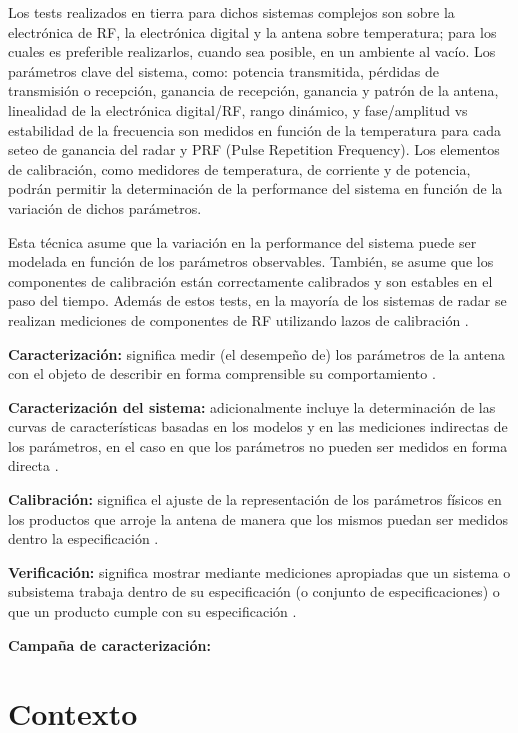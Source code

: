 Los tests realizados en tierra para dichos sistemas complejos son sobre la electrónica de RF, la electrónica digital y la 
antena sobre temperatura; para los cuales es preferible realizarlos, cuando sea posible, en un ambiente al vacío. Los 
parámetros clave del sistema, como: potencia transmitida, pérdidas de transmisión o recepción, ganancia de recepción, 
ganancia y patrón de la antena, linealidad de la electrónica digital/RF, rango dinámico, y fase/amplitud vs estabilidad de la 
frecuencia son medidos en función de la temperatura para cada seteo de ganancia del radar y PRF (Pulse Repetition Frequency). 
Los elementos de calibración, como medidores de temperatura, de corriente y de potencia, podrán permitir la determinación de 
la performance del sistema en función de la variación de dichos parámetros.
    
Esta técnica asume que la variación en la performance del sistema puede ser modelada en función de los parámetros observables. 
También, se asume que los componentes de calibración están correctamente calibrados y son estables en el paso del tiempo. 
Además de estos tests, en la mayoría de los sistemas de radar se realizan mediciones de componentes de RF utilizando lazos de 
calibración \cite{Curlander1991}.

{\textbf{Caracterización:}} significa medir (el desempeño de) los parámetros de la antena con el objeto de describir en 
forma comprensible su comportamiento \cite{Mittermayer2007}.

{\textbf{Caracterización del sistema:}} adicionalmente incluye la determinación de las curvas de características basadas 
en los modelos y en las mediciones indirectas de los parámetros, en el caso en que los parámetros no pueden ser medidos 
en forma directa \cite{Mittermayer2007}.

{\textbf{Calibración:}} significa el ajuste de la representación de los parámetros físicos en los productos que arroje la 
antena de manera que los mismos puedan ser medidos dentro la especificación \cite{Mittermayer2007}.

{\textbf{Verificación:}} significa mostrar mediante mediciones apropiadas que un sistema o subsistema trabaja dentro de su 
especificación (o conjunto de especificaciones) o que un producto cumple con su especificación \cite{Mittermayer2007}.


{\textbf{Campaña de caracterización:}}

\section{Contexto}

